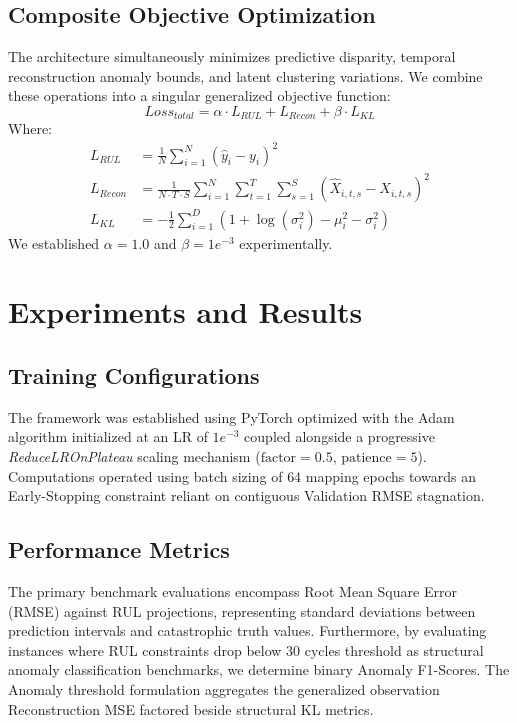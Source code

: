 \documentclass[conference]{IEEEtran}
\begin{document}
\subsection{Composite Objective Optimization}
The architecture simultaneously minimizes predictive disparity, temporal reconstruction anomaly bounds, and latent clustering variations. We combine these operations into a singular generalized objective function:
\begin{equation}
    Loss_{total} = \alpha \cdot L_{RUL} + L_{Recon} + \beta \cdot L_{KL}
\end{equation}
Where:
\begin{align}
    L_{RUL} &= \frac{1}{N}\sum_{i=1}^{N} (\hat{y}_i - y_i)^2 \\
    L_{Recon} &= \frac{1}{N \cdot T \cdot S}\sum_{i=1}^{N} \sum_{t=1}^{T} \sum_{s=1}^{S} (\hat{X}_{i,t,s} - X_{i,t,s})^2 \\
    L_{KL} &= -\frac{1}{2}\sum_{i=1}^{D} \left(1 + \log(\sigma_i^2) - \mu_i^2 - \sigma_i^2\right)
\end{align}
We established $\alpha = 1.0$ and $\beta = 1e^{-3}$ experimentally. 

\section{Experiments and Results}

\subsection{Training Configurations}
The framework was established using PyTorch optimized with the Adam algorithm initialized at an LR of $1e^{-3}$ coupled alongside a progressive \textit{ReduceLROnPlateau} scaling mechanism ($\text{factor}=0.5$, $\text{patience}=5$). Computations operated using batch sizing of $64$ mapping epochs towards an Early-Stopping constraint reliant on contiguous Validation RMSE stagnation.

\subsection{Performance Metrics}
The primary benchmark evaluations encompass Root Mean Square Error (RMSE) against RUL projections, representing standard deviations between prediction intervals and catastrophic truth values. Furthermore, by evaluating instances where RUL constraints drop below $30$ cycles threshold as structural anomaly classification benchmarks, we determine binary Anomaly F1-Scores. The Anomaly threshold formulation aggregates the generalized observation Reconstruction MSE factored beside structural KL metrics. 
\end{document}
